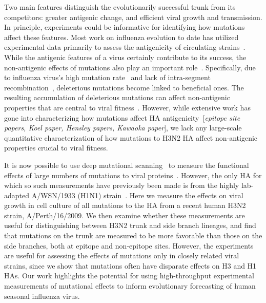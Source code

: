 \documentclass[9pt,twocolumn,twoside]{pnas-new}
\newcommand{\comment}[1]{{\color{red}[\textsl{#1}]}}
\begin{document}
Two main features distinguish the evolutionarily successful trunk from its competitors: greater antigenic change, and efficient viral growth and transmission.
In principle, experiments could be informative for identifying how mutations affect these features.
Most work on influenza evolution to date has utilized experimental data primarily to assess the antigenicity of circulating strains~\cite{sun2013using,harvey2016identification,neher2016prediction}.
While the antigenic features of a virus certainly contribute to its success, the non-antigenic effects of mutations also play an important role~\cite{pybus2007phylogenetic,kucharski2011influenza,strelkowa2012clonal,luksza2014predictive,koelle2015effects}.
Specifically, due to influenza virus's high mutation rate~\cite{holland1982rapid,steinhauer1987rapid,lauring2010quasispecies} and lack of intra-segment recombination~\cite{boni2008homologous}, deleterious mutations become linked to beneficial ones.
The resulting accumulation of deleterious mutations can affect non-antigenic properties that are central to viral fitness~\cite{luksza2014predictive}.
However, while extensive work has gone into characterizing how mutations affect HA antigenicity~\comment{epitope site papers, Koel paper, Hensley papers, Kawaoka paper}, we lack any large-scale quantitative characterization of how mutations to H3N2 HA affect non-antigenic properties crucial to viral fitness.

It is now possible to use deep mutational scanning~\cite{fowler2014deep} to measure the functional effects of large numbers of mutations to viral proteins~\cite{thyagarajan2014inherent,wu2014high,doud2016accurate,haddox2016experimental,qi2015high}.
However, the only HA for which so such measurements have previously been made is from the highly lab-adapted A/WSN/1933 (H1N1) strain~\cite{thyagarajan2014inherent,wu2014high,doud2016accurate}.
Here we measure the effects on viral growth in cell culture of all mutations to the HA from a recent human H3N2 strain, A/Perth/16/2009.
We then examine whether these measurements are useful for distinguishing between H3N2 trunk and side branch lineages, and find that mutations on the trunk are measured to be more favorable than those on the side branches, both at epitope and non-epitope sites.
However, the experiments are useful for assessing the effects of mutations only in closely related viral strains, since we show that mutations often have disparate effects on H3 and H1 HAs.
Our work highlights the potential for using high-throughput experimental measurements of mutational effects to inform evolutionary forecasting of human seasonal influenza virus.
\end{document}
